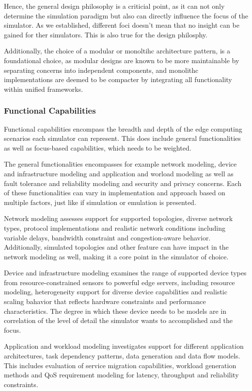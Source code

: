 Hence, the general design philosophy is a criticial point, as it can not only determine the simulation paradigm but also can directly influence the focus of the simulator.
As we established, different foci doesn't mean that no insight can be gained for ther simulators. This is also true for the design philosphy.

Additionally, the choice of a modular or monoltihc architecture pattern, is a foundational choice, as modular designs are known to be more maintainable by separating concerns into independent components, and 
monolithc implementations are deemed to be compacter by integrating all functionality within unified frameworks.

\subsubsection{Functional Capabilities}
Functional capabilities encompass the breadth and depth of the edge computing scenarios each simulator can represent.
This does include general functionalities as well as focus-based capabilities, which needs to be weighted.

The general functionalities encompasses for example network modeling, device and infrastructure modeling and application and worload modeling as well as fault tolerance and reliability modeling and security and privacy concerns.
Each of these functionalities can vary in implementation and approach based on multiple factors, just like if simulation or emulation is presented.

Network modeling assesses support for supported topologies, diverse network types, protocol implementations and realistic network conditions including variable delays, bandwidth constraint and congestion-aware behavior.
Additionally, simulated topologies and other feature can have impact in the network modeling as well, making it a core point in the simulator of choice.

Device and infrastructure modeling examines the range of supported device types from resource-constrained sensors to powerful edge servers, including resource modeling, heterogeneity support for diverse device capabilities and realistic scaling bahavior that reflects hardware constraints and performance characteristics.
The degree in which these device needs to be models are in correlation of the level of detail the simulator wants to accomplished and the focus.

Application and workload modeling investigates support for different application architectures, task dependency patterns, data generation and data flow models.
This includes evaluation of service migration capabilities, workload generation methods and QoS requirement modeling for latency, throughput and reliability constraints.

